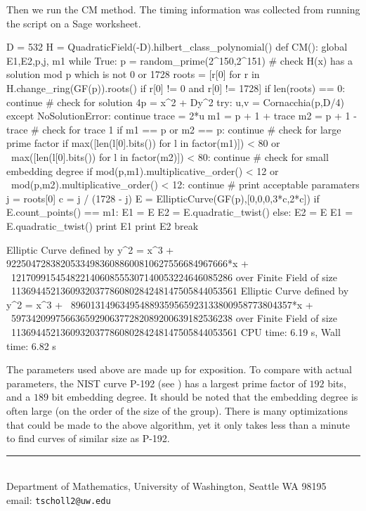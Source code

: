 \documentclass[11pt]{article}
\makeatletter
\newcommand{\myauthor}{Travis Scholl}
\newcommand{\myemail}{tscholl2@uw.edu}
\makeatother
\begin{document}
Then we run the CM method. The timing information was collected from running the script on a Sage worksheet.
\begin{sagecode}
\begin{sagecell}
D = 532
H = QuadraticField(-D).hilbert_class_polynomial()
def CM():
    global E1,E2,p,j, m1
    while True:
        p = random_prime(2^150,2^151)
        # check H(x) has a solution mod p which is not 0 or 1728
        roots = [r[0] for r in H.change_ring(GF(p)).roots() if r[0] != 0 and r[0] != 1728]
        if len(roots) == 0:
            continue
        # check for solution 4p = x^2 + Dy^2
        try:
            u,v = Cornacchia(p,D/4)
        except NoSolutionError:
            continue
        trace = 2*u
        m1 = p + 1 + trace
        m2 = p + 1 - trace
        # check for trace 1
        if m1 == p or m2 == p:
            continue
        # check for large prime factor
        if max([len(l[0].bits()) for l in factor(m1)]) < 80 or \
            max([len(l[0].bits()) for l in factor(m2)]) < 80:
            continue
        # check for small embedding degree
        if mod(p,m1).multiplicative_order() < 12 or \
            mod(p,m2).multiplicative_order() < 12:
            continue
        # print acceptable paramaters
        j = roots[0]
        c = j / (1728 - j)
        E = EllipticCurve(GF(p),[0,0,0,3*c,2*c])
        if E.count_points() == m1:
            E1 = E
            E2 = E.quadratic_twist()
        else:
            E2 = E
            E1 = E.quadratic_twist()
        print E1
        print E2
        break
\end{sagecell}
\begin{sageout}
Elliptic Curve defined by y^2 = x^3 + 922504728382053349836088600810627556684967666*x + \ 
121709915454822140608555307140053224646085286 over Finite Field of size \ 
1136944521360932037786080284248147505844053561
Elliptic Curve defined by y^2 = x^3 + \ 
896013149634954889359565923133800958773804357*x + \ 
597342099756636592906377282089200639182536238 over Finite Field of size \ 
1136944521360932037786080284248147505844053561
CPU time: 6.19 s, Wall time: 6.82 s
\end{sageout}
\end{sagecode}

\begin{rem}
	The parameters used above are made up for exposition. To compare with actual parameters, the NIST curve P-192 (see \cite[D.1.2.1, Pg.~90]{fips2013}) has a largest prime factor of $192$ bits, and a $189$ bit embedding degree. It should be noted that the embedding degree is often large (on the order of the size of the group). There is many optimizations that could be made to the above algorithm, yet it only takes less than a minute to find curves of similar size as P-192.
\end{rem}







\begin{center}
\noindent\rule{4cm}{.5pt}
\vspace{.25cm}

\noindent {\sc \small \myauthor}\\
{\small Department of Mathematics, University of Washington, Seattle WA 98195} \\
email: {\tt \myemail}
\end{center}
\end{document}
